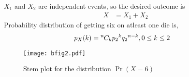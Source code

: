 \documentclass{article}
\providecommand{\pr}[1]{\ensuremath{\Pr\left(#1\right)}}
\newcommand*{\permcomb}[4][0mu]{{{}^{#3}\mkern#1#2_{#4}}}
\newcommand*{\comb}[1][-1mu]{\permcomb[#1]{C}}
\providecommand{\pr}[1]{\ensuremath{\Pr\left(#1\right)}}
\begin{document}
\begin{enumerate}[label=13.\arabic{enumi}.\arabic{enumii}]
\begin{enumerate}
$X_1$ and $X_2$ are independent events, so the desired outcome is
\begin{align}
X&=X_1+X_2
\end{align}
Probability distribution of getting six on atleast one die is,
\begin{align}
p_X(k)   &= \comb{n}{k}{p_2}^{k}{q_2}^{n-k}, 0 \le k \le 2
\end{align}

\begin{figure}
\centering
\texttt{[image: bfig2.pdf]}
\caption{Stem plot for the distribution $\pr{X=6}$}
\label{fig:Plot}
\end{figure}
\end{enumerate}
\end{enumerate}
\end{document}

